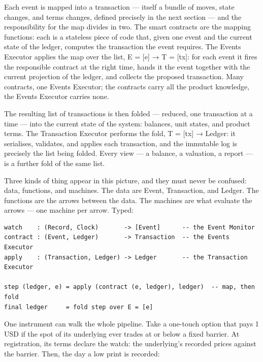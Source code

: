 \documentclass[11pt,a4paper]{article}
\newcommand{\clabel}[1]{\leavevmode\hypertarget{clause-#1}{}%
  \marginpar{\raggedright\scriptsize\ttfamily\textcolor{gray}{#1}}}
\begin{document}
Each event is mapped into a transaction --- itself a bundle of moves,
state changes, and terms changes, defined precisely in the next section
--- and the responsibility for the map divides in two. \clabel{C-3.4}The smart
contracts are the mapping functions: each is a stateless piece of code
that, given one event and the current state of the ledger, computes the
transaction the event requires. The Events Executor applies the map over
the list, E = {[}e{]} → T = {[}tx{]}: for each event it fires the
responsible contract at the right time, hands it the event together with
the current projection of the ledger, and collects the proposed
transaction. Many contracts, one Events Executor; the contracts carry
all the product knowledge, the Events Executor carries none.

The resulting list of transactions is then folded --- reduced, one
transaction at a time --- into the current state of the system:
balances, unit states, and product terms. \clabel{C-3.5}The Transaction Executor
performs the fold, T = {[}tx{]} → Ledger: it serialises, validates, and
applies each transaction, and the immutable log is precisely the list
being folded. Every view --- a balance, a valuation, a report --- is a
further fold of the same list.

\clabel{C-3.6}Three kinds of thing appear in this picture, and they must never be
confused: data, functions, and machines. The data are Event,
Transaction, and Ledger. The functions are the arrows between the data.
The machines are what evaluate the arrows --- one machine per arrow.
Typed:

\begin{verbatim}
watch    : (Record, Clock)       -> [Event]      -- the Event Monitor
contract : (Event, Ledger)       -> Transaction  -- the Events Executor
apply    : (Transaction, Ledger) -> Ledger       -- the Transaction Executor

step (ledger, e) = apply (contract (e, ledger), ledger)  -- map, then fold
final ledger     = fold step over E = [e]
\end{verbatim}

One instrument can walk the whole pipeline. Take a one-touch option that
pays 1 USD if the spot of its underlying ever trades at or below a fixed
barrier. At registration, its terms declare the watch: the underlying's
recorded prices against the barrier. Then, the day a low print is
recorded:
\end{document}

